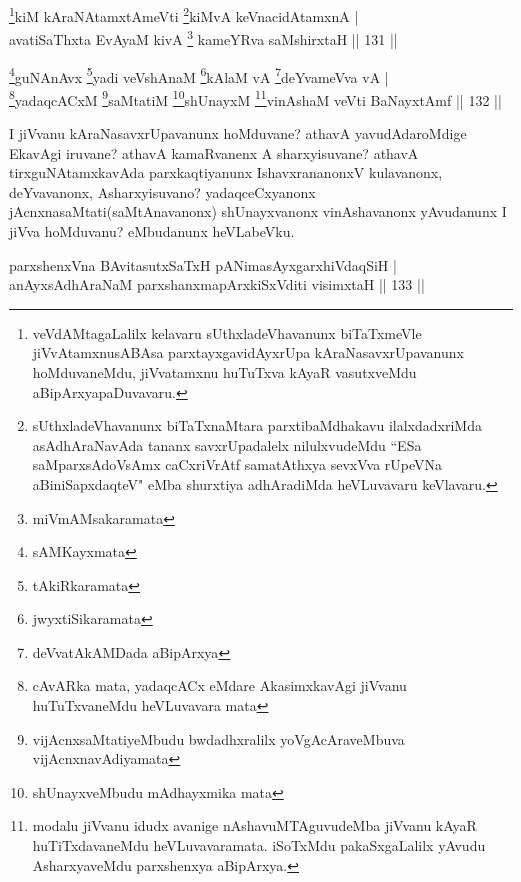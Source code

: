 
\begin{shl}
\footnote{veVdAMtagaLalilx kelavaru sUthxladeVhavanunx biTaTxmeVle jiVvAtamxnusABAsa parxtayxgavidAyxrUpa kAraNasavxrUpavanunx hoMduvaneMdu, jiVvatamxnu huTuTxva kAyaR vasutxveMdu aBipArxyapaDuvavaru.}kiM kAraNAtamxtAmeVti \footnote{sUthxladeVhavanunx biTaTxnaMtara parxtibaMdhakavu ilalxdadxriMda asAdhAraNavAda tananx savxrUpadalelx nilulxvudeMdu ``ESa saMparxsAdoVsAmx caCxriVrAtf samatAthxya sevxVva rUpeVNa aBiniSapxdaqteV" eMba shurxtiya adhAradiMda heVLuvavaru keVlavaru.}kiMvA keVnacidAtamxnA |\\
avatiSaThxta EvAyaM kivA \footnote{miVmAMsakaramata} kameYRva saMshirxtaH \hfill || 131 ||
\end{shl}

\begin{shl}
\footnote{sAMKayxmata}guNAnAvx \footnote{tAkiRkaramata}yadi veVshAnaM \footnote{jwyxtiSikaramata}kAlaM vA \footnote{deVvatAkAMDada aBipArxya}deYvameVva vA |\\
\footnote{cAvARka mata, yadaqcACx eMdare AkasimxkavAgi jiVvanu huTuTxvaneMdu heVLuvavara mata}yadaqcACxM \footnote{vijAcnxsaMtatiyeMbudu bwdadhxralilx yoVgAcAraveMbuva vijAcnxnavAdiyamata}saMtatiM \footnote{shUnayxveMbudu mAdhayxmika mata}shUnayxM \footnote{modalu jiVvanu idudx avanige nAshavuMTAguvudeMba jiVvanu kAyaR huTiTxdavaneMdu heVLuvavaramata. iSoTxMdu pakaSxgaLalilx yAvudu AsharxyaveMdu parxshenxya aBipArxya.}vinAshaM veVti BaNayxtAmf \hfill || 132 ||
\end{shl}

\begin{artha}
I jiVvanu kAraNasavxrUpavanunx hoMduvane? athavA yavudAdaroMdige EkavAgi iruvane? athavA kamaRvanenx A sharxyisuvane? athavA tirxguNAtamxkavAda parxkaqtiyanunx IshavxrananonxV kulavanonx, deYvavanonx, Asharxyisuvano? yadaqceCxyanonx jAcnxnasaMtati(saMtAnavanonx) shUnayxvanonx vinAshavanonx yAvudanunx I jiVva hoMduvanu? eMbudanunx heVLabeVku.
\end{artha}


\begin{shl}
parxshenxVna BAvitasutxSaTxH pANimasAyxgarxhiVdaqSiH |\\
anAyxsAdhAraNaM parxshanxmapArxkiSxVditi visimxtaH \hfill || 133 ||
\end{shl}

